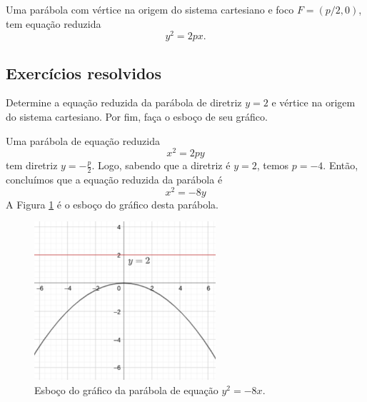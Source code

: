 \begin{obs}
  Uma parábola com vértice na origem do sistema cartesiano e foco $F=(p/2, 0)$, tem equação reduzida
  \begin{equation}
    y^2 = 2px.
  \end{equation}
\end{obs}

\subsection*{Exercícios resolvidos}

\begin{exeresol}
  Determine a equação reduzida da parábola de diretriz $y=2$ e vértice na origem do sistema cartesiano. Por fim, faça o esboço de seu gráfico.
\end{exeresol}
\begin{resol}
  Uma parábola de equação reduzida
  \begin{equation}
    x^2 = 2py
  \end{equation}
  tem diretriz $\displaystyle y=-\frac{p}{2}$. Logo, sabendo que a diretriz é $y=2$, temos $p = -4$. Então, concluímos que a equação reduzida da parábola é
  \begin{equation}
    x^2 = -8y
  \end{equation}
  A Figura \ref{fig:parabola_exeresol_yp} é o esboço do gráfico desta parábola.

  \begin{figure}[H]
    \centering
    \includegraphics[width=0.6\textwidth]{cap_conicas/dados/fig_parabola_exeresol_yp/fig}
    \caption{Esboço do gráfico da parábola de equação $y^2 = -8x$.}
    \label{fig:parabola_exeresol_yp}
  \end{figure}  
\end{resol}

